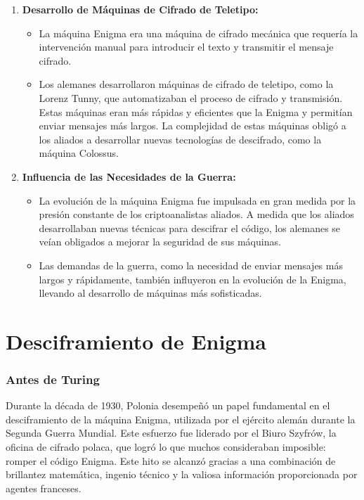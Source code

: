 \documentclass{article}
\begin{document}
\begin{enumerate}
    \item \textbf{Desarrollo de Máquinas de Cifrado de Teletipo:}
    \begin{itemize}
        \item La máquina Enigma era una máquina de cifrado mecánica que requería la intervención manual 
        para introducir el texto y transmitir el mensaje cifrado.
        \item Los alemanes desarrollaron máquinas de cifrado de teletipo, como la Lorenz Tunny, que 
        automatizaban el proceso de cifrado y transmisión. Estas máquinas eran más rápidas y eficientes 
        que la Enigma y permitían enviar mensajes más largos. La complejidad de estas máquinas obligó a 
        los aliados a desarrollar nuevas tecnologías de descifrado, como la máquina Colossus.\cite{ColossusO}
    \end{itemize}

    \item \textbf{Influencia de las Necesidades de la Guerra:}
    \begin{itemize}
        \item La evolución de la máquina Enigma fue impulsada en gran medida por la presión constante de 
        los criptoanalistas aliados. A medida que los aliados desarrollaban nuevas técnicas para descifrar 
        el código, los alemanes se veían obligados a mejorar la seguridad de sus máquinas.\cite{AlanTuringEnigmaO}
        \item Las demandas de la guerra, como la necesidad de enviar mensajes más largos y rápidamente, 
        también influyeron en la evolución de la Enigma, llevando al desarrollo de máquinas más sofisticadas.\cite{AlanTuringEnigmaO}
    \end{itemize}
\end{enumerate}



\section*{Desciframiento de Enigma }

\subsubsection{Antes de Turing}
Durante la década de 1930, Polonia desempeñó 
un papel fundamental en el desciframiento de la 
máquina Enigma, utilizada por el ejército alemán 
durante la Segunda Guerra Mundial. Este esfuerzo 
fue liderado por el Biuro Szyfrów, la oficina de 
cifrado polaca, que logró lo que muchos consideraban 
imposible: romper el código Enigma. Este hito se alcanzó 
gracias a una combinación de brillantez matemática, ingenio 
técnico y la valiosa información proporcionada por agentes 
franceses.\cite{AlanTuringEnigmaO}
\end{document}
